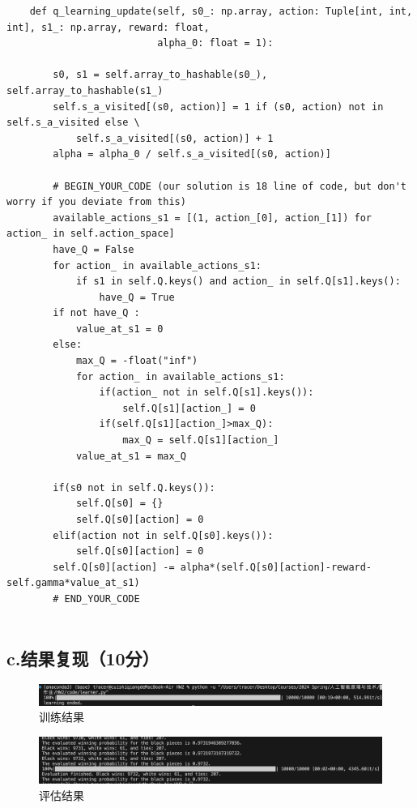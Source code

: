 \documentclass{article}
\begin{document}
\begin{lstlisting}
    def q_learning_update(self, s0_: np.array, action: Tuple[int, int, int], s1_: np.array, reward: float,
                          alpha_0: float = 1):

        s0, s1 = self.array_to_hashable(s0_), self.array_to_hashable(s1_)
        self.s_a_visited[(s0, action)] = 1 if (s0, action) not in self.s_a_visited else \
            self.s_a_visited[(s0, action)] + 1
        alpha = alpha_0 / self.s_a_visited[(s0, action)]

        # BEGIN_YOUR_CODE (our solution is 18 line of code, but don't worry if you deviate from this)
        available_actions_s1 = [(1, action_[0], action_[1]) for action_ in self.action_space]
        have_Q = False
        for action_ in available_actions_s1:
            if s1 in self.Q.keys() and action_ in self.Q[s1].keys():
                have_Q = True
        if not have_Q :
            value_at_s1 = 0
        else:
            max_Q = -float("inf")
            for action_ in available_actions_s1:
                if(action_ not in self.Q[s1].keys()):
                    self.Q[s1][action_] = 0
                if(self.Q[s1][action_]>max_Q):
                    max_Q = self.Q[s1][action_]
            value_at_s1 = max_Q
        
        if(s0 not in self.Q.keys()):
            self.Q[s0] = {}
            self.Q[s0][action] = 0
        elif(action not in self.Q[s0].keys()):
            self.Q[s0][action] = 0
        self.Q[s0][action] -= alpha*(self.Q[s0][action]-reward-self.gamma*value_at_s1)
        # END_YOUR_CODE


\end{lstlisting}



\subsection*{c.结果复现（10分）}
\begin{figure}[H]
    \centering
    \includegraphics[width=15cm]{pics/3_train.png}
    \caption{训练结果}
\end{figure}
\begin{figure}[H]
    \centering
    \includegraphics[width=15cm]{pics/3_eval.png}
    \caption{评估结果}
\end{figure}
\end{document}
